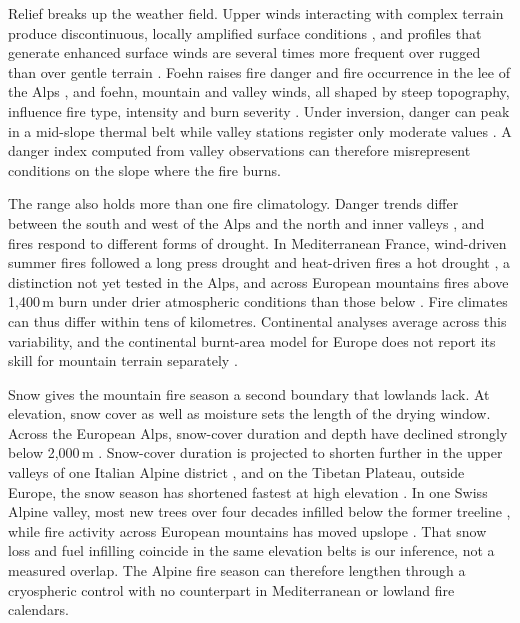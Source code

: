 \documentclass[11pt,a4paper]{article}
\begin{document}
Relief breaks up the weather field. Upper winds interacting with complex terrain produce discontinuous, locally amplified surface conditions \citep{sharples_overview_2009}, and profiles that generate enhanced surface winds are several times more frequent over rugged than over gentle terrain \citep{ozaki_impact_2022}. Foehn raises fire danger and fire occurrence in the lee of the Alps \citep{wastl_largescale_2013}, and foehn, mountain and valley winds, all shaped by steep topography, influence fire type, intensity and burn severity \citep{melzner_wildfire-induced_2025}. Under inversion, danger can peak in a mid-slope thermal belt while valley stations register only moderate values \citep{schunk_forest_2013}. A danger index computed from valley observations can therefore misrepresent conditions on the slope where the fire burns.

The range also holds more than one fire climatology. Danger trends differ between the south and west of the Alps and the north and inner valleys \citep{wastl_recent_2012}, and fires respond to different forms of drought. In Mediterranean France, wind-driven summer fires followed a long press drought and heat-driven fires a hot drought \citep{ruffault_extreme_2018}, a distinction not yet tested in the Alps, and across European mountains fires above 1,400\,m burn under drier atmospheric conditions than those below \citep{beloiu_climatedriven_2026}. Fire climates can thus differ within tens of kilometres. Continental analyses average across this variability, and the continental burnt-area model for Europe does not report its skill for mountain terrain separately \citep{forrest_understanding_2024}.

Snow gives the mountain fire season a second boundary that lowlands lack. At elevation, snow cover as well as moisture sets the length of the drying window. Across the European Alps, snow-cover duration and depth have declined strongly below 2{,}000\,m \citep{pepin_climate_2022}. Snow-cover duration is projected to shorten further in the upper valleys of one Italian Alpine district \citep{pede_mountain_2022}, and on the Tibetan Plateau, outside Europe, the snow season has shortened fastest at high elevation \citep{rangwala_climate_2012}. In one Swiss Alpine valley, most new trees over four decades infilled below the former treeline \citep{frei_evidence_2023}, while fire activity across European mountains has moved upslope \citep{beloiu_climatedriven_2026}. That snow loss and fuel infilling coincide in the same elevation belts is our inference, not a measured overlap. The Alpine fire season can therefore lengthen through a cryospheric control with no counterpart in Mediterranean or lowland fire calendars.
\end{document}

